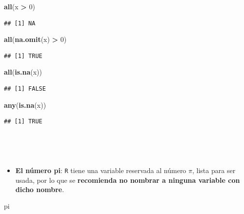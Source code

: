\documentclass[11pt,]{book}
\newenvironment{Shaded}{\begin{snugshade}}{\end{snugshade}}
\newcommand{\DecValTok}[1]{\textcolor[rgb]{0.06,0.06,0.06}{#1}}
\newcommand{\KeywordTok}[1]{\textcolor[rgb]{0.27,0.27,0.27}{\textbf{#1}}}
\newcommand{\NormalTok}[1]{#1}
\newcommand{\OperatorTok}[1]{\textcolor[rgb]{0.43,0.43,0.43}{\textbf{#1}}}
\newcommand{\StringTok}[1]{\textcolor[rgb]{0.5,0.5,0.5}{#1}}
\providecommand{\tightlist}{%
  \setlength{\itemsep}{0pt}\setlength{\parskip}{0pt}}
\begin{document}
\begin{Shaded}
\begin{Highlighting}[]
\KeywordTok{all}\NormalTok{(x }\OperatorTok{>}\StringTok{ }\DecValTok{0}\NormalTok{)}
\end{Highlighting}
\end{Shaded}

\begin{verbatim}
## [1] NA
\end{verbatim}

\begin{Shaded}
\begin{Highlighting}[]
\KeywordTok{all}\NormalTok{(}\KeywordTok{na.omit}\NormalTok{(x) }\OperatorTok{>}\StringTok{ }\DecValTok{0}\NormalTok{)}
\end{Highlighting}
\end{Shaded}

\begin{verbatim}
## [1] TRUE
\end{verbatim}

\begin{Shaded}
\begin{Highlighting}[]
\KeywordTok{all}\NormalTok{(}\KeywordTok{is.na}\NormalTok{(x))}
\end{Highlighting}
\end{Shaded}

\begin{verbatim}
## [1] FALSE
\end{verbatim}

\begin{Shaded}
\begin{Highlighting}[]
\KeywordTok{any}\NormalTok{(}\KeywordTok{is.na}\NormalTok{(x))}
\end{Highlighting}
\end{Shaded}

\begin{verbatim}
## [1] TRUE
\end{verbatim}

~

~

\begin{itemize}
\tightlist
\item
  \textbf{El número pi}: \texttt{R} tiene una variable reservada al número \(\pi\), lista para ser usada, por lo que se \textbf{recomienda no nombrar a ninguna variable con dicho nombre}.
\end{itemize}

\begin{Shaded}
\begin{Highlighting}[]
\NormalTok{pi}
\end{Highlighting}
\end{Shaded}
\end{document}
